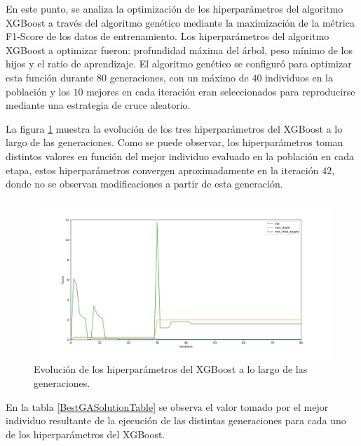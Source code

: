 \documentclass{uathesis-es}
\begin{document}
{		%
		
		En este punto, se analiza la optimización de los hiperparámetros del algoritmo XGBoost a través del algoritmo genético mediante la maximización de la métrica F1-Score de los datos de entrenamiento. Los hiperparámetros del algoritmo XGBoost a optimizar fueron: profundidad máxima del árbol, peso mínimo de los hijos y el ratio de aprendizaje. El algoritmo genético se configuró para optimizar esta función durante $80$ generaciones, con un máximo de $40$ individuos en la población y los $10$ mejores en cada iteración eran seleccionados para reproducirse mediante una estrategia de cruce aleatorio.
		
		La figura \ref{EvolucionHiperparametrosImage} muestra la evolución de  los tres hiperparámetros del XGBoost a lo largo de las generaciones. Como se puede observar, los hiperparámetros toman distintos valores en función del mejor individuo evaluado en la población en cada etapa, estos hiperparámetros convergen aproximadamente en la iteración $42$, donde no se observan modificaciones a partir de esta generación.
		
		\begin{figure}[H]
			\centering
			\includegraphics[width=14cm]{Figures/1stPaper/EvolutionH.png}
			\caption{Evolución de los hiperparámetros del XGBoost a lo largo de las generaciones.}
			\label{EvolucionHiperparametrosImage}
		\end{figure}
		
		En la tabla \ref{BestGASolutionTable} se observa el valor tomado por el mejor individuo resultante de la ejecución de las distintas generaciones para cada uno de los hiperparámetros del XGBoost. 
		
}
\end{document}
